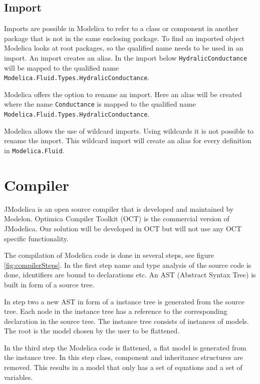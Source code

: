 \documentclass{cslthse-msc}
\begin{document}
\subsection{Import}
Imports are possible in Modelica to refer to a class or component in another package that is not in the same enclosing package. To find an imported object Modelica looks at root packages, so the qualified name needs to be used in an import. An import creates an alias. In the import below \texttt{HydralicConductance} will be mapped to the qualified name \texttt{Modelica.Fluid.Types.HydralicConductance}.



Modelica offers the option to rename an import. Here an alias will be created where the name \texttt{Conductance} is mapped to the qualified name \texttt{Modelica.Fluid.Types.HydralicConductance}.



Modelica allows the use of wildcard imports. Using wildcards it is not possible to rename the import. This wildcard import will create an alias for every definition in \texttt{Modelica.Fluid}.



\section{Compiler}
JModelica is an open source compiler that is developed and maintained by Modelon. Optimica Compiler Toolkit (OCT) is the commercial version of JModelica. Our solution will be developed in OCT but will not use any OCT specific functionality. 

The compilation of Modelica code is done in several steps, see figure \ref{fig:compilerSteps}. In the first step name and type analysis of the source code is done, identifiers are bound to declarations etc. An AST (Abstract Syntax Tree) is built in form of a source tree.


In step two a new AST in form of a instance tree is generated from the source tree. Each node in the instance tree has a reference to the corresponding declaration in the source tree. The instance tree consists of instances of models. The root is the model chosen by the user to be flattened.

In the third step the Modelica code is flattened, a flat model is generated from the instance tree. In this step class, component and inheritance structures are removed. This results in a model that only has a set of equations and a set of variables.
\end{document}
